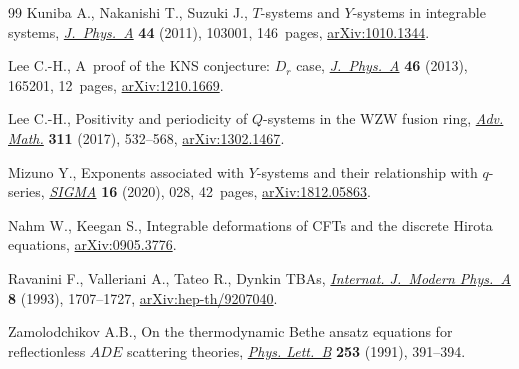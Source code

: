 \begin{thebibliography}{99}
Kuniba A., Nakanishi T., Suzuki J., {$T$}-systems and {$Y$}-systems in
 integrable systems, \href{https://doi.org/10.1088/1751-8113/44/10/103001}{\textit{J.~Phys.~A}} \textbf{44} (2011), 103001,
 146~pages, \href{https://arxiv.org/abs/1010.1344}{arXiv:1010.1344}.

Lee C.-H., A~proof of the {KNS} conjecture: {$D_r$} case, \href{https://doi.org/10.1088/1751-8113/46/16/165201}{\textit{J.~Phys.~A}}
 \textbf{46} (2013), 165201, 12~pages, \href{https://arxiv.org/abs/1210.1669}{arXiv:1210.1669}.

Lee C.-H., Positivity and periodicity of {$Q$}-systems in the {WZW} fusion ring,
 \href{https://doi.org/10.1016/j.aim.2017.02.031}{\textit{Adv. Math.}} \textbf{311} (2017), 532--568, \href{https://arxiv.org/abs/1302.1467}{arXiv:1302.1467}.

Mizuno Y., Exponents associated with {$Y$}-systems and their relationship with
 {$q$}-series, \href{https://doi.org/10.3842/SIGMA.2020.028}{\textit{SIGMA}} \textbf{16} (2020), 028, 42~pages,
 \href{https://arxiv.org/abs/1812.05863}{arXiv:1812.05863}.

Nahm W., Keegan S., Integrable deformations of {CFT}s and the discrete {H}irota
 equations, \href{https://arxiv.org/abs/0905.3776}{arXiv:0905.3776}.

Ravanini F., Valleriani A., Tateo R., Dynkin {TBA}s, \href{https://doi.org/10.1142/S0217751X93000709}{\textit{Internat.
 J.~Modern Phys.~A}} \textbf{8} (1993), 1707--1727, \href{https://arxiv.org/abs/hep-th/9207040}{arXiv:hep-th/9207040}.

Zamolodchikov A.B., On the thermodynamic {B}ethe ansatz equations for
 reflectionless {$ADE$} scattering theories, \href{https://doi.org/10.1016/0370-2693(91)91737-G}{\textit{Phys. Lett.~B}}
 \textbf{253} (1991), 391--394.

\end{thebibliography}
